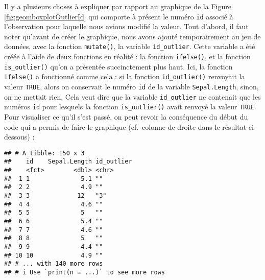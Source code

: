 \documentclass[
  french,
]{book}
\newenvironment{Shaded}{\begin{snugshade}}{\end{snugshade}}
\newcommand{\DataTypeTok}[1]{\textcolor[rgb]{0.13,0.29,0.53}{#1}}
\newcommand{\DecValTok}[1]{\textcolor[rgb]{0.00,0.00,0.81}{#1}}
\newcommand{\KeywordTok}[1]{\textcolor[rgb]{0.13,0.29,0.53}{\textbf{#1}}}
\newcommand{\NormalTok}[1]{#1}
\newcommand{\OperatorTok}[1]{\textcolor[rgb]{0.81,0.36,0.00}{\textbf{#1}}}
\newcommand{\StringTok}[1]{\textcolor[rgb]{0.31,0.60,0.02}{#1}}
\begin{document}
Il y a plusieurs choses à expliquer par rapport au graphique de la Figure \ref{fig:geomboxplotOutlierId} qui comporte à présent le numéro \texttt{id} associé à l'observation pour laquelle nous avions modifié la valeur. Tout d'abord, il faut noter qu'avant de créer le graphique, nous avons ajouté temporairement au jeu de données, avec la fonction \texttt{mutate()}, la variable \texttt{id\_outlier}. Cette variable a été créée à l'aide de deux fonctions en réalité : la fonction \texttt{ifelse()}, et la fonction \texttt{is\_outlier()} qu'on a présentée succinctement plus haut. Ici, la fonction \texttt{ifelse()} a fonctionné comme cela : si la fonction \texttt{id\_outlier()} renvoyait la valeur \texttt{TRUE}, alors on conservait le numéro \texttt{id} de la variable \texttt{Sepal.Length}, sinon, on ne mettait rien. Cela veut dire que la variable \texttt{id\_outlier} ne contenait que les numéros \texttt{id} pour lesquels la fonction \texttt{is\_outlier()} avait renvoyé la valeur \texttt{TRUE}. Pour visualiser ce qu'il s'est passé, on peut revoir la conséquence du début du code qui a permis de faire le graphique (cf.~colonne de droite dans le résultat ci-dessous) :

\begin{Shaded}
\end{Shaded}

\begin{verbatim}
## # A tibble: 150 x 3
##    id    Sepal.Length id_outlier
##    <fct>        <dbl> <chr>     
##  1 1              5.1 ""        
##  2 2              4.9 ""        
##  3 3             12   "3"       
##  4 4              4.6 ""        
##  5 5              5   ""        
##  6 6              5.4 ""        
##  7 7              4.6 ""        
##  8 8              5   ""        
##  9 9              4.4 ""        
## 10 10             4.9 ""        
## # ... with 140 more rows
## # i Use `print(n = ...)` to see more rows
\end{verbatim}
\end{document}
